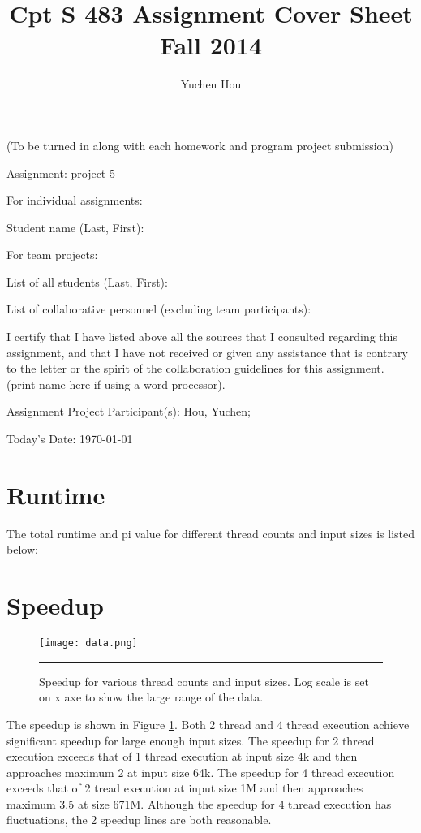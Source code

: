 \documentclass[12pt]{article}
\begin{document}
\title{Cpt S 483 Assignment Cover Sheet \\ Fall 2014
}
\author{Yuchen Hou}
\maketitle

(To be turned in along with each homework and program project submission)

Assignment: project 5

For individual assignments:

Student name (Last, First):

For team projects:

List of all students (Last, First):

List of collaborative personnel (excluding team participants):

I certify that I have listed above all the sources that I consulted regarding this assignment, and that I have not received or given any assistance that is contrary to the letter or the spirit of the collaboration guidelines for this assignment. (print name here if using a word processor).

Assignment Project Participant(s): Hou, Yuchen;

Today's Date: \today

\pagebreak

\section{Runtime}
The total runtime and pi value for different thread counts and input sizes is listed below:


\section{Speedup}
\begin{figure}%
  \centering
      {\texttt{[image: data.png]}} \rule{1\linewidth}{1pt}
      \caption{Speedup for various thread counts and input sizes. Log scale is set on x axe to show the large range of the data.}
      \label{fig:data}
\end{figure}
The speedup is shown in Figure \ref{fig:data}. Both 2 thread and 4 thread execution achieve significant speedup for large enough input sizes. The speedup for 2 thread execution exceeds that of 1 thread execution at input size 4k and then approaches maximum 2 at input size 64k. The speedup for 4 thread execution exceeds that of 2 tread execution at input size 1M and then approaches maximum 3.5 at size 671M. Although the speedup for 4 thread execution has fluctuations, the 2 speedup lines are both reasonable.
\end{document}
